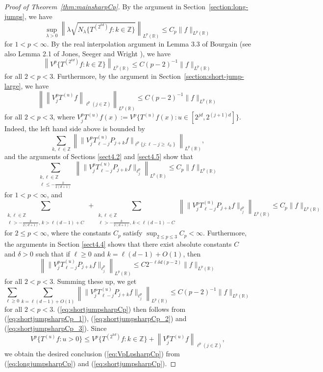 \documentclass[12pt,leqno]{amsart}
\def\R{\mathbb{R}}
\def\Z{\mathbb{Z}}
\def\beq{\begin{equation}}
\def\endeq{\end{equation}}
\theoremstyle{plain}
\numberwithin{equation}{section}
\begin{document}
\begin{proof}[Proof of Theorem~\ref{thm:mainsharpCp}]
By the argument in Section~\ref{section:long-jumps}, we have
$$
\sup_{\lambda > 0} \left \| \lambda \sqrt{ N_{\lambda} \{T^{(2^{kd})} f \colon k \in \Z \} } \right \|_{L^p(\R)} \leq C_p \|f\|_{L^p(\R)}
$$
for $1 < p < \infty$. By the real interpolation argument in Lemma 3.3 of Bourgain \cite{MR1019960} (see also Lemma 2.1 of Jones, Seeger and Wright \cite{MR2434308}), we have
\beq \label{eq:longjumpsharpCp}
\left \| V^p \{T^{(2^{kd})} f \colon k \in \Z \} \right \|_{L^p(\R)} \leq C (p-2)^{-1} \|f\|_{L^p(\R)}
\endeq
for all $2 < p < 3$. Furthermore, by the argument in Section~\ref{section:short-jump-large}, we have 
\beq \label{eq:shortjumpsharpCp}
\left \|  \left\| V^p_j T^{(u)}f \right\|_{\ell^p(j \in \Z)} \right \|_{L^p(\R)} \leq C (p-2)^{-1} \|f\|_{L^p(\R)}
\endeq
for all $2 < p < 3$, where $V^p_j T^{(u)}f(x) := V^p \{ T^{(u)} f(x) \colon u \in [2^{jd},2^{(j+1)d}] \}$. Indeed, the left hand side above is bounded by
$$
\sum_{k, \ell \in \Z} \left\| \|V_j^{p} T^{(u)}_{\ell-j} P_{j+k} f \|_{\ell^p {\{j \colon \ell - j \geq \ell_0\}}} \right\|_{L^p(\R)}, 
$$
and the arguments of Sections \ref{sect4.2} and \ref{sect4.5} show that 
\beq \label{eq:shortjumpsharpCp_1}
\sum_{\substack{k, \ell \in \Z \\ \ell \leq -\frac{k}{2(d+1)}}} \left \| \|V_j^{p} T^{(u)}_{\ell-j} P_{j+k} f \|_{\ell^p_j} \right\|_{L^p(\R)} \leq C_p \|f\|_{L^p(\R)}
\endeq
for $1 < p < \infty$, and
\beq \label{eq:shortjumpsharpCp_2}
\sum_{\substack{k, \ell \in \Z \\ \ell > -\frac{k}{2(d+1)}, \, k > \ell(d-1) + C}} + \sum_{\substack{k, \ell \in \Z \\ \ell > -\frac{k}{2(d+1)}, \, k < \ell(d-1) - C}} \left \| \|V_j^{p} T^{(u)}_{\ell-j} P_{j+k} f \|_{\ell^p_j} \right\|_{L^p(\R)} \leq C_p \|f\|_{L^p(\R)}
\endeq
for $2 \leq p < \infty$, where the constants $C_p$ satisfy $\sup_{2 \leq p \leq 3} C_p < \infty$. Furthermore, the arguments in Section \ref{sect4.4} shows that there exist absolute constants $C$ and $\delta > 0$ such that if $\ell \geq 0$ and $k = \ell(d-1) + O(1)$, then
$$
\left \| \|V_j^{p} T^{(u)}_{\ell-j} P_{j+k} f \|_{\ell^p_j} \right\|_{L^p(\R)} \leq C 2^{-\ell \delta d (p-2)} \|f\|_{L^p(\R)}
$$
for all $2 < p < 3$.
Summing these up, we get 
\beq \label{eq:shortjumpsharpCp_3}
\sum_{\ell \geq 0} \sum_{k = \ell(d-1)+O(1)} \left \| \|V_j^{p} T^{(u)}_{\ell-j} P_{j+k} f \|_{\ell^p_j} \right\|_{L^p(\R)} \leq C (p-2)^{-1} \|f\|_{L^p(\R)}
\endeq
for all $2 < p < 3$. (\ref{eq:shortjumpsharpCp}) then follows from (\ref{eq:shortjumpsharpCp_1}), (\ref{eq:shortjumpsharpCp_2}) and (\ref{eq:shortjumpsharpCp_3}). Since 
$$
 V^p \{T^{(u)} f \colon u > 0 \}  \leq  V^p \{T^{(2^{kd})} f \colon k \in \Z \} + \left\| V^p_j T^{(u)}f \right\|_{\ell^p(j \in \Z)},
$$
we obtain the desired conclusion (\ref{eq:VpLpsharpCp}) from (\ref{eq:longjumpsharpCp}) and (\ref{eq:shortjumpsharpCp}).
\end{proof}
\end{document}
